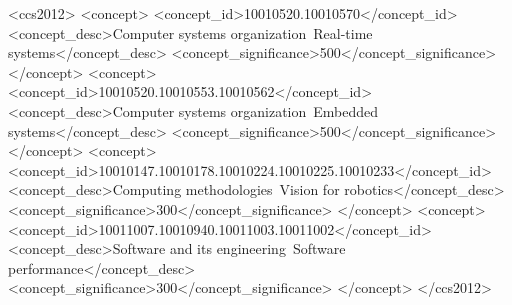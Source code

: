 \documentclass[sigconf,review,anonymous]{acmart}
\begin{document}
\begin{CCSXML}
<ccs2012>
   <concept>
       <concept_id>10010520.10010570</concept_id>
       <concept_desc>Computer systems organization~Real-time systems</concept_desc>
       <concept_significance>500</concept_significance>
   </concept>
   <concept>
       <concept_id>10010520.10010553.10010562</concept_id>
       <concept_desc>Computer systems organization~Embedded systems</concept_desc>
       <concept_significance>500</concept_significance>
   </concept>
   <concept>
       <concept_id>10010147.10010178.10010224.10010225.10010233</concept_id>
       <concept_desc>Computing methodologies~Vision for robotics</concept_desc>
       <concept_significance>300</concept_significance>
   </concept>
   <concept>
       <concept_id>10011007.10010940.10011003.10011002</concept_id>
       <concept_desc>Software and its engineering~Software performance</concept_desc>
       <concept_significance>300</concept_significance>
   </concept>
</ccs2012>
\end{CCSXML}
\end{document}
